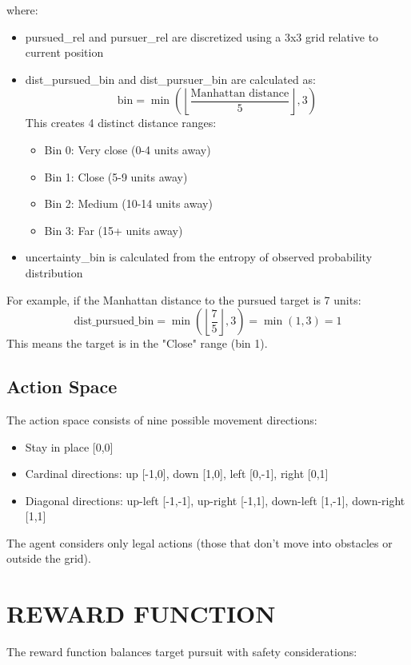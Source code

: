 \documentclass[letterpaper, 10 pt, conference]{ieeeconf}
\begin{document}
where:
\begin{itemize}
    \item pursued\_rel and pursuer\_rel are discretized using a 3x3 grid relative to current position
    \item dist\_pursued\_bin and dist\_pursuer\_bin are calculated as:
    \[
    \text{bin} = \min\left(\left\lfloor\frac{\text{Manhattan distance}}{5}\right\rfloor, 3\right)
    \]
    This creates 4 distinct distance ranges:
    \begin{itemize}
        \item Bin 0: Very close (0-4 units away)
        \item Bin 1: Close (5-9 units away)
        \item Bin 2: Medium (10-14 units away)
        \item Bin 3: Far (15+ units away)
    \end{itemize}
    \item uncertainty\_bin is calculated from the entropy of observed probability distribution
\end{itemize}

For example, if the Manhattan distance to the pursued target is 7 units:
\[
\text{dist\_pursued\_bin} = \min\left(\left\lfloor\frac{7}{5}\right\rfloor, 3\right) = \min(1, 3) = 1
\]
This means the target is in the "Close" range (bin 1).

\subsection{Action Space}
The action space consists of nine possible movement directions:
\begin{itemize}
    \item Stay in place [0,0]
    \item Cardinal directions: up [-1,0], down [1,0], left [0,-1], right [0,1]
    \item Diagonal directions: up-left [-1,-1], up-right [-1,1], down-left [1,-1], down-right [1,1]
\end{itemize}

The agent considers only legal actions (those that don't move into obstacles or outside the grid).

\section{REWARD FUNCTION}
The reward function balances target pursuit with safety considerations:
\end{document}
